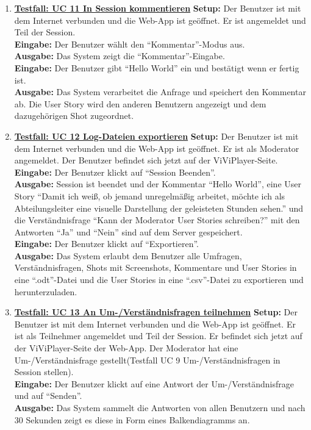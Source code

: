 \begin{enumerate}
	\item \underline{\textbf{Testfall: UC 11 In Session kommentieren}} \linebreak
	\textbf{Setup:} Der Benutzer ist mit dem Internet verbunden und die Web-App ist geöffnet. Er ist angemeldet und Teil der Session.\\
	\textbf{Eingabe:} Der Benutzer wählt den ``Kommentar''-Modus aus. \\
	\textbf{Ausgabe:} Das System zeigt die ``Kommentar''-Eingabe. \\
	\textbf{Eingabe:} Der Benutzer gibt ``Hello World'' ein und bestätigt wenn er fertig ist.\\
	\textbf{Ausgabe:} Das System verarbeitet die Anfrage und speichert den Kommentar ab. Die User Story wird den anderen Benutzern angezeigt und dem dazugehörigen Shot zugeordnet.
	
	\item \underline{\textbf{Testfall: UC 12 Log-Dateien exportieren}} \linebreak
	\textbf{Setup:} Der Benutzer ist mit dem Internet verbunden und die Web-App ist geöffnet. Er ist als Moderator angemeldet. Der Benutzer befindet sich jetzt auf der ViViPlayer-Seite. \\
	\textbf{Eingabe:} Der Benutzer klickt auf ``Session Beenden''.\\
	\textbf{Ausgabe:} Session ist beendet und der Kommentar ``Hello World'', eine User Story ``Damit ich weiß, ob jemand unregelmäßig arbeitet, möchte ich als Abteilungsleiter eine visuelle Darstellung der geleisteten Stunden sehen.'' und die Verständnisfrage ``Kann der Moderator User Stories schreiben?'' mit den Antworten ``Ja'' und ``Nein'' sind auf dem Server gespeichert.\\
	\textbf{Eingabe:} Der Benutzer klickt auf ``Exportieren''. \\
	\textbf{Ausgabe:} Das System erlaubt dem Benutzer alle Umfragen, Verständnisfragen, Shots mit Screenshots, Kommentare und User Stories in eine ``.odt''-Datei und die User Stories in eine ``.csv''-Datei zu exportieren und herunterzuladen.\\ 
	
	\item \underline{\textbf{Testfall: UC 13 An Um-/Verständnisfragen teilnehmen}} \linebreak
	\textbf{Setup:} Der Benutzer ist mit dem Internet verbunden und die Web-App ist geöffnet. Er ist als Teilnehmer angemeldet und Teil der Session. Er befindet sich jetzt auf der ViViPlayer-Seite der Web-App. Der Moderator hat eine Um-/Verständnisfrage gestellt(Testfall UC 9 Um-/Verständnisfragen in Session stellen).\\
	\textbf{Eingabe:} Der Benutzer klickt auf eine Antwort der Um-/Verständnisfrage und auf ``Senden''.\\
	\textbf{Ausgabe:} Das System sammelt die Antworten von allen Benutzern und nach 30 Sekunden zeigt es diese in Form eines Balkendiagramms an.
	
	
	
\end{enumerate}
